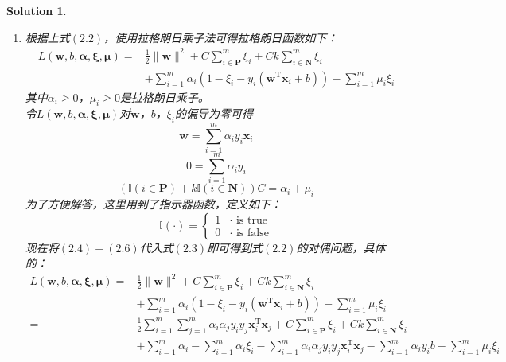 \documentclass[a4paper,UTF8]{article}
\numberwithin{equation}{section}
\newtheorem*{mySol}{Solution}
\begin{document}
\begin{mySol}
\begin{enumerate}[(1)]
\item 
根据上式$(2.2)$，使用拉格朗日乘子法可得拉格朗日函数如下：
\begin{equation}
\begin{aligned}
L(\mathbf{w},b,\boldsymbol{\alpha},\boldsymbol{\xi},\boldsymbol{\mu}) =& \frac{1}{2} \lVert \mathbf{w} \rVert^2 + C\sum_{i \in \mathbf{P}}^m\xi_i + Ck\sum_{i \in \mathbf{N}}^m\xi_i\\
& + \sum_{i=1}^{m}\alpha_i(1-\xi_i-y_i(\mathbf{w}^\mathrm{T}\mathbf{x}_i + b)) - \sum_{i=1}^{m}\mu_i\xi_i 
\end{aligned}
\end{equation}
其中$\alpha_i \geq 0$，$\mu_i \geq 0$是拉格朗日乘子。\\
令$L(\mathbf{w},b,\boldsymbol{\alpha},\boldsymbol{\xi},\boldsymbol{\mu})$对$\mathbf{w}$，$b$，$\xi_i$的偏导为零可得
\begin{equation}
	\mathbf{w} = \sum_{i=1}^{m}\alpha_iy_i\mathbf{x}_i
\end{equation}
\begin{equation}
	0=\sum_{i=1}^{m}\alpha_iy_i
\end{equation}
\begin{equation}
	(\mathbb{I}(i\in \mathbf{P}) + k\mathbb{I}(i\in \mathbf{N}) )C = \alpha_i + \mu_i
\end{equation}
为了方便解答，这里用到了指示器函数，定义如下：
\begin{equation}
\mathbb{I}(\cdot) = 
\begin{cases}
1 & \mbox{$\cdot$ is true}\\
0 & \mbox{$\cdot$ is false}
\end{cases}
\end{equation}
现在将$(2.4)-(2.6)$代入式$(2.3)$即可得到式$(2.2)$的对偶问题，具体的：
\begin{equation}
\begin{aligned}
L(\mathbf{w},b,\boldsymbol{\alpha},\boldsymbol{\xi},\boldsymbol{\mu}) =& \frac{1}{2} \lVert \mathbf{w} \rVert^2 + C\sum_{i \in \mathbf{P}}^m\xi_i + Ck\sum_{i \in \mathbf{N}}^m\xi_i\\
& + \sum_{i=1}^{m}\alpha_i(1-\xi_i-y_i(\mathbf{w}^\mathrm{T}\mathbf{x}_i + b)) - \sum_{i=1}^{m}\mu_i\xi_i \\
=& \frac{1}{2}\sum_{i=1}^{m}\sum_{j=1}^{m}\alpha_i\alpha_jy_iy_j\mathbf{x}_i^\mathrm{T}\mathbf{x}_j + C\sum_{i \in \mathbf{P}}^m\xi_i + Ck\sum_{i \in \mathbf{N}}^m\xi_i\\
& + \sum_{i=1}^{m}\alpha_i - \sum_{i=1}^{m}\alpha_i\xi_i - \sum_{i=1}^{m}\alpha_i\alpha_jy_iy_j\mathbf{x}_i^\mathrm{T}\mathbf{x}_j - \sum_{i=1}^{m}\alpha_iy_ib - \sum_{i=1}^{m}\mu_i\xi_i\\

\end{aligned}
\end{equation}
\end{enumerate}
\end{mySol}
\end{document}
